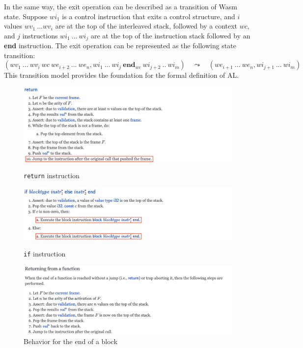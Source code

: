 In the same way, the exit operation can be described as a transition of Wasm
state.
Suppose $wi_1$ is a control instruction that exits a control structure, and $i$
values $wv_1 ~ ... wv_i$ are at the top of the interleaved stack, followed by a
context $wc$, and $j$ instructions $wi_1 ~ ... ~ wi_j$ are at the top of the
instruction stack followed by an \textbf{end} instruction.
The exit operation can be represented as the following state transition:
\[
(wv_1 ~ ... ~ wv_i ~ wc ~ we_{i+2} ~ ...  ~ we_n,
  wi_1 ~ ... ~ wi_j ~ \textbf{end}_{wc} ~ wi_{j+2} ~ ..  ~ wi_m)
  \quad\leadsto\quad
  (we_{i+1} ~ ... ~ we_n, wi_{j+1} ~ ... ~ wi_m)
\]
This transition model provides the foundation for the formal definition of AL.

\newpage

\begin{figure}[h]
  \centerline{\includegraphics[width=15cm]{fig/return}}
  \caption[\texttt{return} instruction]{\texttt{return} instruction}
    \label{fig:return}
  \centerline{\includegraphics[width=15cm]{fig/if}}
  \caption[\texttt{if} instruction]{\texttt{if} instruction}
    \label{fig:if}
  \centerline{\includegraphics[width=15cm]{fig/returning}}
  \caption[Behavior for the end a block]{Behavior for the end of a block}
    \label{fig:exiting-label}
\end{figure}





